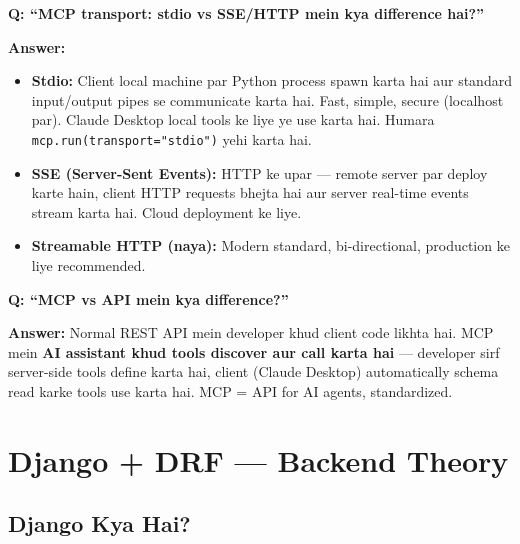 \documentclass[11pt, a4paper]{article}
\begin{document}
\begin{interviewbox}
\textbf{Q: ``MCP transport: stdio vs SSE/HTTP mein kya difference hai?''}

\textbf{Answer:}
\begin{itemize}
\item \textbf{Stdio:} Client local machine par Python process spawn karta hai aur standard input/output pipes se communicate karta hai. Fast, simple, secure (localhost par). Claude Desktop local tools ke liye ye use karta hai. Humara \texttt{mcp.run(transport="stdio")} yehi karta hai.
\item \textbf{SSE (Server-Sent Events):} HTTP ke upar --- remote server par deploy karte hain, client HTTP requests bhejta hai aur server real-time events stream karta hai. Cloud deployment ke liye.
\item \textbf{Streamable HTTP (naya):} Modern standard, bi-directional, production ke liye recommended.
\end{itemize}
\end{interviewbox}

\begin{interviewbox}
\textbf{Q: ``MCP vs API mein kya difference?''}

\textbf{Answer:} Normal REST API mein developer khud client code likhta hai. MCP mein \textbf{AI assistant khud tools discover aur call karta hai} --- developer sirf server-side tools define karta hai, client (Claude Desktop) automatically schema read karke tools use karta hai. MCP = API for AI agents, standardized.
\end{interviewbox}

\section{Django + DRF --- Backend Theory}

\subsection{Django Kya Hai?}
\end{document}
